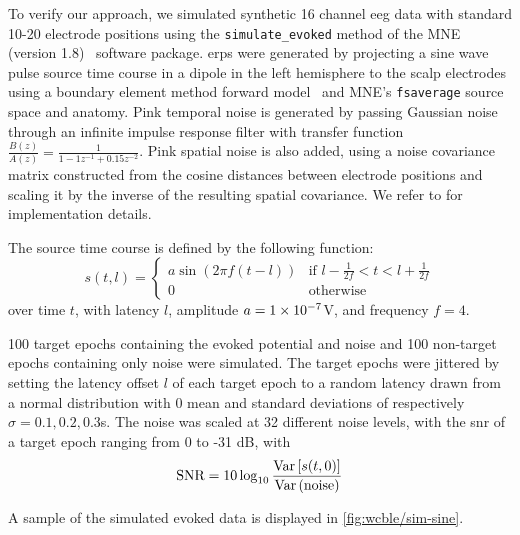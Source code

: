 To verify our approach, we simulated synthetic 16 channel \ac{eeg} data with standard
10-20 electrode positions using the \texttt{simulate\_evoked} method of the
MNE (version 1.8)~\cite{Gramfort2013} software package.
\Acp{erp} were generated by projecting a sine wave pulse source time course in a dipole in the
left hemisphere to the scalp electrodes using a boundary element method forward
model~\cite{Mosher1999} and MNE's \texttt{fsaverage} source space and anatomy.
Pink temporal noise is generated by passing Gaussian noise through an infinite
impulse response filter with transfer function
$\frac{B(z)}{A(z)} = \frac{1}{1 -1z^{-1}+0.15z^{-2}}$.
Pink spatial noise is also added, using a noise covariance matrix constructed from the
cosine distances between electrode positions and scaling it by the inverse of
the resulting spatial covariance.
We refer to \textcite{Gramfort2014} for implementation details.

The source time course is defined by the following function:
\begin{equation}
  s(t,l) =
  \begin{cases}
    a\sin\left(2\pi f\left(t-l\right)\right) & \text{if  $l-\frac{1}{2f} < t < l+\frac{1}{2f}$} \\
    0 & \text{otherwise}
  \end{cases}
\end{equation}
over time $t$, with latency $l$, amplitude $a=\num{1e{-7}}$V, and frequency
$f=4$.

100 target epochs containing the evoked potential and noise and 100
non-target epochs containing only noise were simulated.
The target epochs were jittered by setting the latency offset $l$
of each target epoch to a random latency drawn from a normal distribution with 0 mean and standard
deviations of respectively $\sigma=0.1,0.2,0.3$s.
The noise was scaled at 32 different noise levels, with the \ac{snr} of a
target epoch ranging from 0 to -31 dB, with
\begin{equation}
  \text{SNR} = 10\log_{10}\frac{\operatorname{Var}\left[s(t,0)\right]}{\operatorname{Var}\left(\text{noise}\right)}
\end{equation}

A sample of the simulated evoked data is displayed in \cref{fig:wcble/sim-sine}.




